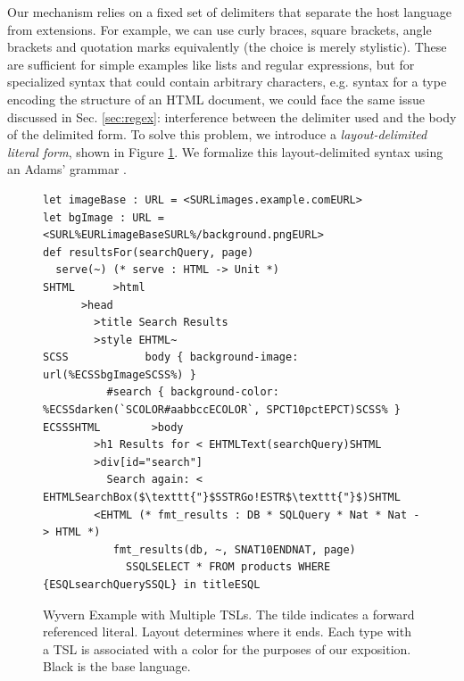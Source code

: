\begin{contribution}\label{cont:layout-delimited-literals}
Our mechanism relies on a fixed set of delimiters that separate the host language from extensions. For example, we can use curly braces, square brackets, angle brackets and quotation marks equivalently (the choice is merely stylistic). These are sufficient for simple examples like lists and regular expressions, but for specialized syntax that could contain arbitrary characters, e.g. syntax for a type encoding the structure of an HTML document, we could face the same issue discussed in Sec. \ref{sec:regex}: interference between the delimiter used and the body of the delimited form. To solve this problem, we introduce a \emph{layout-delimited literal form}, shown in Figure \ref{fig:html}. We formalize this layout-delimited syntax using an Adams' grammar \cite{Adams:2013:PPI:2429069.2429129}.

\begin{figure}[t]
\begin{lstlisting}
let imageBase : URL = <SURLimages.example.comEURL>
let bgImage : URL = <SURL%EURLimageBaseSURL%/background.pngEURL>
def resultsFor(searchQuery, page)
  serve(~) (* serve : HTML -> Unit *)
SHTML      >html
      >head
        >title Search Results
        >style EHTML~
SCSS            body { background-image: url(%ECSSbgImageSCSS%) }
          #search { background-color: %ECSSdarken(`SCOLOR#aabbccECOLOR`, SPCT10pctEPCT)SCSS% }
ECSSSHTML        >body
        >h1 Results for < EHTMLText(searchQuery)SHTML
        >div[id="search"]
          Search again: < EHTMLSearchBox($\texttt{"}$SSTRGo!ESTR$\texttt{"}$)SHTML
        <EHTML (* fmt_results : DB * SQLQuery * Nat * Nat -> HTML *)
           fmt_results(db, ~, SNAT10ENDNAT, page)
             SSQLSELECT * FROM products WHERE {ESQLsearchQuerySSQL} in titleESQL
\end{lstlisting}
\caption{Wyvern Example with Multiple TSLs. The tilde indicates a forward referenced literal. Layout determines where it ends. Each type with a TSL is associated with a color for the purposes of our exposition. Black is the base language.}
\label{fig:html}
\end{figure}\end{contribution}




